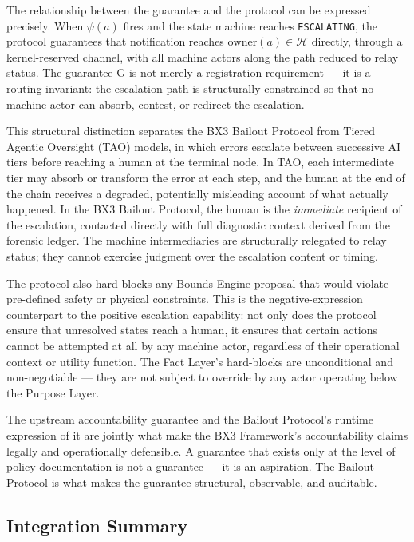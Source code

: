 The relationship between the guarantee and the protocol can be expressed precisely. When $\psi(a)$ fires and the state machine reaches \texttt{ESCALATING}, the protocol guarantees that notification reaches $\text{owner}(a) \in \mathcal{H}$ directly, through a kernel-reserved channel, with all machine actors along the path reduced to relay status. The guarantee G is not merely a registration requirement — it is a routing invariant: the escalation path is structurally constrained so that no machine actor can absorb, contest, or redirect the escalation.

This structural distinction separates the BX3 Bailout Protocol from Tiered Agentic Oversight (TAO) models, in which errors escalate between successive AI tiers before reaching a human at the terminal node. In TAO, each intermediate tier may absorb or transform the error at each step, and the human at the end of the chain receives a degraded, potentially misleading account of what actually happened. In the BX3 Bailout Protocol, the human is the \textit{immediate} recipient of the escalation, contacted directly with full diagnostic context derived from the forensic ledger. The machine intermediaries are structurally relegated to relay status; they cannot exercise judgment over the escalation content or timing.

The protocol also hard-blocks any Bounds Engine proposal that would violate pre-defined safety or physical constraints. This is the negative-expression counterpart to the positive escalation capability: not only does the protocol ensure that unresolved states reach a human, it ensures that certain actions cannot be attempted at all by any machine actor, regardless of their operational context or utility function. The Fact Layer's hard-blocks are unconditional and non-negotiable — they are not subject to override by any actor operating below the Purpose Layer.

The upstream accountability guarantee and the Bailout Protocol's runtime expression of it are jointly what make the BX3 Framework's accountability claims legally and operationally defensible. A guarantee that exists only at the level of policy documentation is not a guarantee — it is an aspiration. The Bailout Protocol is what makes the guarantee structural, observable, and auditable.

\subsection{Integration Summary}
\label{sec:integration-summary}

